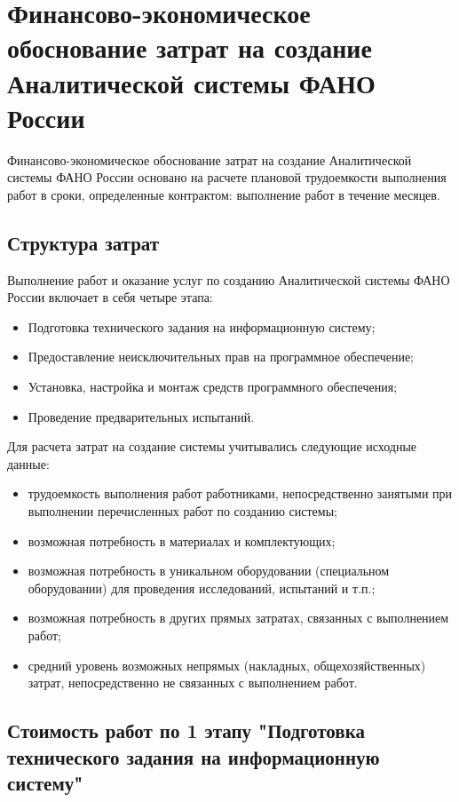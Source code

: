 \chapter{Финансово-экономическое обоснование затрат на создание Аналитической системы ФАНО России} 
\label{cha:appendix1}




Финансово-экономическое обоснование затрат на создание Аналитической системы ФАНО России основано на расчете плановой трудоемкости выполнения работ в сроки, определенные контрактом: выполнение работ в течение месяцев.


\section*{Структура затрат}

Выполнение работ и оказание услуг по созданию Аналитической системы ФАНО России включает в себя четыре этапа:
\begin{itemize}
\item 	Подготовка технического задания на информационную систему;
\item 	Предоставление неисключительных прав на программное обеспечение;
\item 	Установка, настройка и монтаж средств программного обеспечения;
\item 	Проведение предварительных испытаний.
\end{itemize}

Для расчета затрат на создание системы учитывались следующие исходные данные:

\begin{itemize}
\item трудоемкость выполнения работ работниками, непосредственно занятыми при выполнении перечисленных работ по созданию системы;
\item	возможная потребность в материалах и комплектующих;
\item	возможная потребность в уникальном оборудовании (специальном оборудовании) для проведения исследований, испытаний и т.п.;
\item	возможная потребность в других прямых затратах, связанных с выполнением работ;
\item	средний уровень возможных непрямых (накладных, общехозяйственных) затрат, непосредственно не связанных с выполнением работ.
\end{itemize}

\section*{Стоимость работ по 1 этапу "Подготовка технического задания на информационную систему"}

